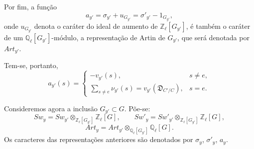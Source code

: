 Por fim, a função
\[
a_{y'}=\sigma_{y'}+u_{G_{y'}}=\sigma'_{y'}-1_{G_{y'}},
\tag{4.2.5}
\]
onde $u_{G_{y'}}$ denota o caráter do ideal de aumento de $\mathbb Z_\ell[G_{y'}]$, é também o caráter de um $\mathbb Q_\ell[G_{y'}]$-módulo, a representação de Artin de $G_{y'}$, que será denotada por $Art_{y'}$.

Tem-se, portanto,
\[
a_{y'}(s)=
\begin{cases}
-v_{y'}(s),& s\ne e,\\[0.4em]
\displaystyle\sum_{s\ne e}\nu_{y'}(s)=v_{y'}(\mathfrak D_{C'/C}),& s=e.
\end{cases}
\tag{4.2.6}
\]

Consideremos agora a inclusão $G_{y'}\subset G$. Põe-se:
\[
Sw_y=Sw_{y'}\otimes_{\mathbb Z_\ell[G_{y'}]}\mathbb Z_\ell[G],
\qquad
Sw'_y=Sw'_{y'}\otimes_{\mathbb Z_\ell[G_{y'}]}\mathbb Z_\ell[G],
\tag{4.2.7}
\]
\[
Art_y=Art_{y'}\otimes_{\mathbb Q_\ell[G_{y'}]}\mathbb Q_\ell[G].
\tag{4.2.8}
\]
Os caracteres das representações anteriores são denotados por $\sigma_y$, $\sigma'_y$, $a_y$.

